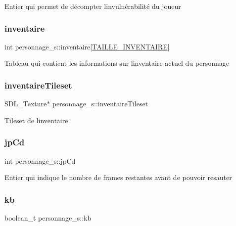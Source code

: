 Entier qui permet de décompter l\textquotesingle{}invulnérabilité du joueur \mbox{\label{structpersonnage__s_a0aefe070eb6c9c73fe6a40c909d2dc30}} 
\subsubsection{\texorpdfstring{inventaire}{inventaire}}
{\footnotesize\ttfamily int personnage\+\_\+s\+::inventaire\mbox{[}\hyperlink{structs_8h_a5fdcc1659ee790f8bdd196e7745ab403}{T\+A\+I\+L\+L\+E\+\_\+\+I\+N\+V\+E\+N\+T\+A\+I\+RE}\mbox{]}}

Tableau qui contient les informations sur l\textquotesingle{}inventaire actuel du personnage \mbox{\label{structpersonnage__s_a1fa7220d864d9cacc6a8ce191f9bcf29}} 
\subsubsection{\texorpdfstring{inventaire\+Tileset}{inventaireTileset}}
{\footnotesize\ttfamily S\+D\+L\+\_\+\+Texture$\ast$ personnage\+\_\+s\+::inventaire\+Tileset}

Tileset de l\textquotesingle{}inventaire \mbox{\label{structpersonnage__s_a05d061a818efa6b7bfa5b3c76ba3b8dd}} 
\subsubsection{\texorpdfstring{jp\+Cd}{jpCd}}
{\footnotesize\ttfamily int personnage\+\_\+s\+::jp\+Cd}

Entier qui indique le nombre de frames restantes avant de pouvoir resauter \mbox{\label{structpersonnage__s_aa492d3f9ab87bf03fcb94a65b77bcd34}} 
\subsubsection{\texorpdfstring{kb}{kb}}
{\footnotesize\ttfamily boolean\+\_\+t personnage\+\_\+s\+::kb}

